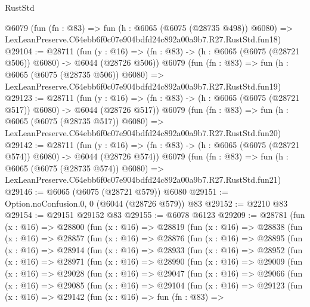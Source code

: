 \begin{lexlean}{RustStd}
\begin{coremodule}
    @6079
    (fun (fn : @83) =>
    fun (h : @6065 (@6075 (@28735 @498)) @6080) =>
    LexLeanPreserve.C64ebb6f0c07e904bdfd24c892a00a9b7.R27.RustStd.fun18)
@29104 := @28711
    (fun (y : @16) => (fn : @83) -> (h : @6065 (@6075 (@28721 @506)) @6080) -> @6044 (@28726 @506))
    @6079
    (fun (fn : @83) =>
    fun (h : @6065 (@6075 (@28735 @506)) @6080) =>
    LexLeanPreserve.C64ebb6f0c07e904bdfd24c892a00a9b7.R27.RustStd.fun19)
@29123 := @28711
    (fun (y : @16) => (fn : @83) -> (h : @6065 (@6075 (@28721 @517)) @6080) -> @6044 (@28726 @517))
    @6079
    (fun (fn : @83) =>
    fun (h : @6065 (@6075 (@28735 @517)) @6080) =>
    LexLeanPreserve.C64ebb6f0c07e904bdfd24c892a00a9b7.R27.RustStd.fun20)
@29142 := @28711
    (fun (y : @16) => (fn : @83) -> (h : @6065 (@6075 (@28721 @574)) @6080) -> @6044 (@28726 @574))
    @6079
    (fun (fn : @83) =>
    fun (h : @6065 (@6075 (@28735 @574)) @6080) =>
    LexLeanPreserve.C64ebb6f0c07e904bdfd24c892a00a9b7.R27.RustStd.fun21)
@29146 := @6065 (@6075 (@28721 @579)) @6080
@29151 := Option.noConfusion.{0, 0} (@6044 (@28726 @579)) @83
@29152 := @2210 @83
@29154 := @29151 @29152 @83
@29155 := @6078 @6123
@29209 := @28781
    (fun (x : @16) =>
    @28800
      (fun (x : @16) =>
      @28819
        (fun (x : @16) =>
        @28838
          (fun (x : @16) =>
          @28857
            (fun (x : @16) =>
            @28876
              (fun (x : @16) =>
              @28895
                (fun (x : @16) =>
                @28914
                  (fun (x : @16) =>
                  @28933
                    (fun (x : @16) =>
                    @28952
                      (fun (x : @16) =>
                      @28971
                        (fun (x : @16) =>
                        @28990
                          (fun (x : @16) =>
                          @29009
                            (fun (x : @16) =>
                            @29028
                              (fun (x : @16) =>
                              @29047
                                (fun (x : @16) =>
                                @29066
                                  (fun (x : @16) =>
                                  @29085
                                    (fun (x : @16) =>
                                    @29104
                                      (fun (x : @16) =>
                                      @29123
                                        (fun (x : @16) =>
                                        @29142
                                          (fun (x : @16) =>
                                          fun (fn : @83) =>

\end{coremodule}
\end{lexlean}
